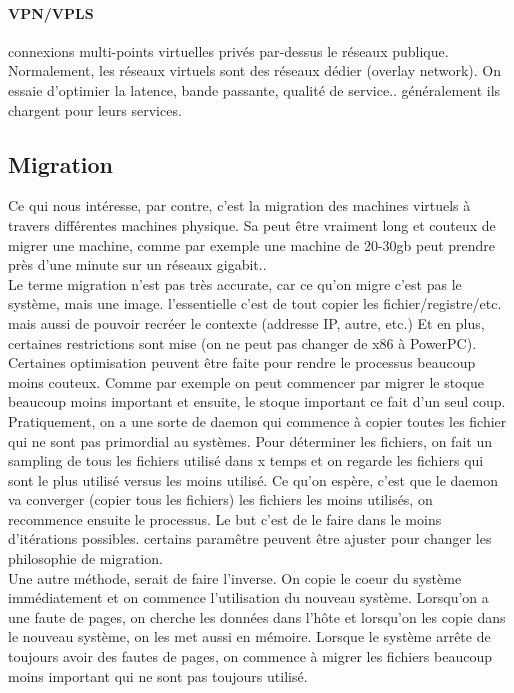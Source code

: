\documentclass[oneside]{book}
\begin{document}
\paragraph{VPN/VPLS}
connexions multi-points virtuelles privés par-dessus le réseaux publique.\\

Normalement, les réseaux virtuels sont des réseaux dédier (overlay network). On essaie d'optimier la latence, bande passante, qualité de service.. généralement ils chargent pour leurs services.\\

\subsection{Migration}
Ce qui nous intéresse, par contre, c'est la migration des machines virtuels à travers différentes machines physique. Sa peut être vraiment long et couteux de migrer une machine, comme par exemple une machine de 20-30gb peut prendre près d'une minute sur un réseaux gigabit..\\

Le terme migration n'est pas très accurate, car ce qu'on migre c'est pas le système, mais une image. l'essentielle c'est de tout copier les fichier/registre/etc. mais aussi de pouvoir recréer le contexte (addresse IP, autre, etc.) Et en plus, certaines restrictions sont mise (on ne peut pas changer de x86 à PowerPC). Certaines optimisation peuvent être faite pour rendre le processus beaucoup moins couteux. Comme par exemple on peut commencer par migrer le stoque beaucoup moins important et ensuite, le stoque important ce fait d'un seul coup.\\

Pratiquement, on a une sorte de daemon qui commence à copier toutes les fichier qui ne sont pas primordial au systèmes. Pour déterminer les fichiers, on fait un sampling de tous les fichiers utilisé dans x temps et on regarde les fichiers qui sont le plus utilisé versus les moins utilisé. Ce qu'on espère, c'est que le daemon va converger (copier tous les fichiers) les fichiers les moins utilisés, on recommence ensuite le processus. Le but c'est de le faire dans le moins d'itérations possibles. certains paramêtre peuvent être ajuster pour changer les philosophie de migration.\\

Une autre méthode, serait de faire l'inverse. On copie le coeur du système immédiatement et on commence l'utilisation du nouveau système. Lorsqu'on a une faute de pages, on cherche les données dans l'hôte et lorsqu'on les copie dans le nouveau système, on les met aussi en mémoire. Lorsque le système arrête de toujours avoir des fautes de pages, on commence à migrer les fichiers beaucoup moins important qui ne sont pas toujours utilisé. \\
\end{document}
